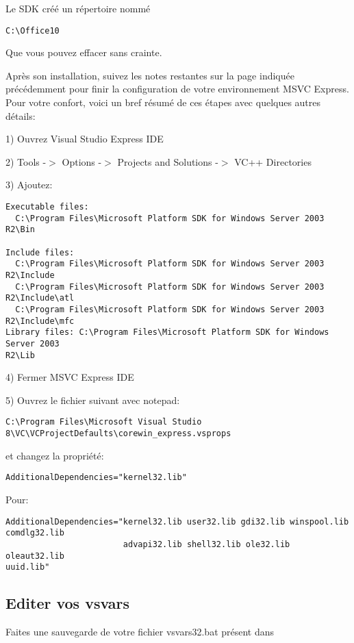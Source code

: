 Le SDK créé un répertoire nommé

\begin{verbatim}
C:\Office10
\end{verbatim}

Que vous pouvez effacer sans crainte.

Après son installation, suivez les notes restantes sur la page indiquée précédemment pour finir la configuration de votre environnement MSVC Express. Pour votre confort, voici un bref résumé de ces étapes avec quelques autres détails:

1) Ouvrez Visual Studio Express IDE

2) Tools -$>$ Options -$>$ Projects and Solutions -$>$ VC++ Directories

3) Ajoutez:

\begin{verbatim}
Executable files: 
  C:\Program Files\Microsoft Platform SDK for Windows Server 2003 R2\Bin

Include files: 
  C:\Program Files\Microsoft Platform SDK for Windows Server 2003 R2\Include
  C:\Program Files\Microsoft Platform SDK for Windows Server 2003 R2\Include\atl
  C:\Program Files\Microsoft Platform SDK for Windows Server 2003 R2\Include\mfc
Library files: C:\Program Files\Microsoft Platform SDK for Windows Server 2003
R2\Lib
\end{verbatim}

4) Fermer MSVC Express IDE

5) Ouvrez le fichier suivant avec notepad:

\begin{verbatim}
C:\Program Files\Microsoft Visual Studio
8\VC\VCProjectDefaults\corewin_express.vsprops
\end{verbatim}

et changez la propriété:

\begin{verbatim}
AdditionalDependencies="kernel32.lib"
\end{verbatim}

Pour:

\begin{verbatim}
AdditionalDependencies="kernel32.lib user32.lib gdi32.lib winspool.lib
comdlg32.lib 
                        advapi32.lib shell32.lib ole32.lib oleaut32.lib
uuid.lib"
\end{verbatim}

\subsection{Editer vos vsvars}
Faites une sauvegarde de votre fichier vsvars32.bat présent dans

